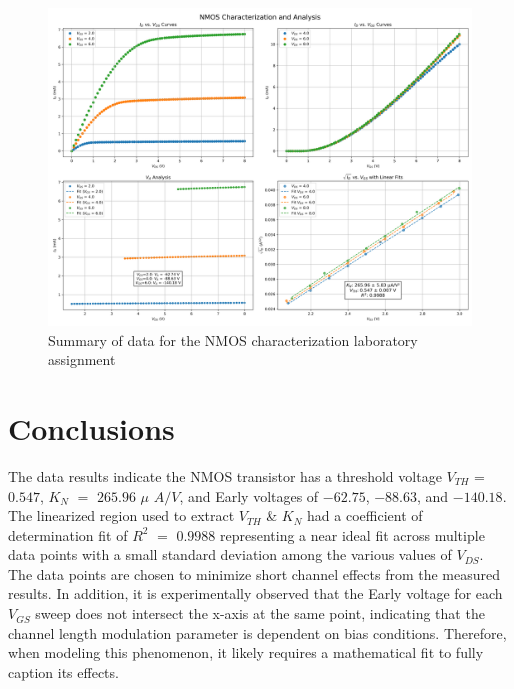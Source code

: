 \begin{figure}[ht]
\includegraphics[scale=0.15]{graphics/Lab_01_1_3.png}
\caption{Summary of data for the NMOS characterization laboratory assignment}
\label{Ch1_fig:3}
\end{figure}

\section{Conclusions}
The data results indicate the NMOS transistor has a threshold voltage $V_{TH}$ = $0.547$, $K_{N}$ $=$ $265.96$ $\mu $ $A/V$, and Early voltages of $-62.75$, $-88.63$, and $-140.18$. The linearized region used to extract $V_{TH}$ \& $K_{N}$ had a coefficient of determination fit of $R^{2}$ $=$ $0.9988$ representing a near ideal fit across multiple data points with a small standard deviation among the various values of $V_{DS}$. The data points are chosen to minimize short channel effects from the measured results. In addition, it is experimentally observed that the Early voltage for each $V_{GS}$ sweep does not intersect the x-axis at the same point, indicating that the channel length modulation parameter is dependent on bias conditions. Therefore, when modeling this phenomenon, it likely requires a mathematical fit to fully caption its effects.